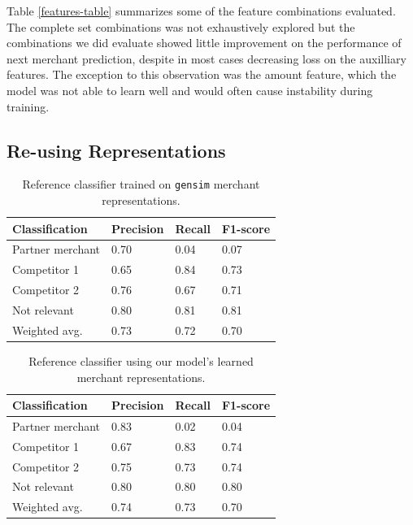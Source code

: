\documentclass{article}
\begin{document}
Table \ref{features-table} summarizes some of the feature combinations evaluated. The complete set combinations was not exhaustively explored but the combinations we did evaluate showed little improvement on the performance of next merchant prediction, despite in most cases decreasing loss on the auxilliary features. The exception to this observation was the amount feature, which the model was not able to learn well and would often cause instability during training.

\subsection{Re-using Representations}

\begin{table}
  \caption{Reference classifier trained on \texttt{gensim} merchant representations.}
  \label{gensim-eval}
  \centering
  \begin{tabular}{l|lll}
    \toprule
    Classification &
    		Precision &
    		Recall &
         F1-score \\
    \midrule
    Partner merchant & 0.70 & 0.04 & 0.07 \\
    Competitor 1 & 0.65 & 0.84 & 0.73 \\
    Competitor 2 & 0.76 & 0.67 & 0.71 \\
    Not relevant & 0.80 & 0.81 & 0.81 \\
    \midrule
    Weighted avg. & 0.73 & 0.72 & 0.70 \\
    \bottomrule
  \end{tabular}
\end{table}

\begin{table}
  \caption{Reference classifier using our model's learned merchant representations.}
  \label{merchant-rep-eval}
  \centering
  \begin{tabular}{l|lll}
    \toprule
    Classification &
    		Precision &
    		Recall &
         F1-score \\
    \midrule
    Partner merchant & 0.83 & 0.02 & 0.04 \\
    Competitor 1 & 0.67 & 0.83 & 0.74 \\
    Competitor 2 & 0.75 & 0.73 & 0.74 \\
    Not relevant & 0.80 & 0.80 & 0.80 \\
    \midrule
    Weighted avg. & 0.74 & 0.73 & 0.70 \\
    \bottomrule
  \end{tabular}
\end{table}
\end{document}
